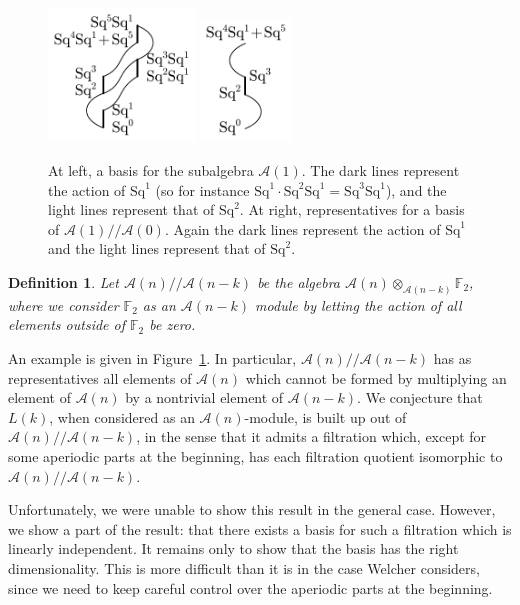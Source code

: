 \documentclass{article}
\newcommand{\A}{\mathcal{A}}
\newcommand{\F}{\mathbb{F}}
\newcommand{\Sq}{\mathrm{Sq}}
\newcommand{\mmod}{/\!/\!}
\newtheorem{defn}{Definition}
\begin{document}
\begin{figure}
  \begin{center}
    \includegraphics[height=1.4in]{pics/A1.pdf}
    \hspace{1in}
    \includegraphics[height=1.3in]{pics/A1-A0.pdf}
  \end{center}
  \caption{At left, a basis for the subalgebra $\A(1)$.  The dark lines represent the action of $\Sq^1$ (so for instance $\Sq^1 \cdot \Sq^2\Sq^1 = \Sq^3\Sq^1$), and the light lines represent that of $\Sq^2$.  At right, representatives for a basis of $\A(1)\mmod\A(0)$.  Again the dark lines represent the action of $\Sq^1$ and the light lines represent that of $\Sq^2$.\label{fig:A1}}
\end{figure}

\begin{defn}
  Let $\A(n)\mmod\A(n-k)$ be the algebra $\A(n)\otimes_{\A(n-k)}\F_2$, where we consider $\F_2$ as an $\A(n-k)$ module by letting the action of all elements outside of $\F_2$ be zero.
\end{defn}

An example is given in Figure~\ref{fig:A1}.  In particular, $\A(n)\mmod\A(n-k)$ has as representatives all elements of $\A(n)$ which cannot be formed by multiplying an element of $\A(n)$ by a nontrivial element of $\A(n-k)$.  We conjecture that $L(k)$, when considered as an $\A(n)$-module, is built up out of $\A(n)\mmod\A(n-k)$, in the sense that it admits a filtration which, except for some aperiodic parts at the beginning, has each filtration quotient isomorphic to $\A(n)\mmod\A(n-k)$.

Unfortunately, we were unable to show this result in the general case.  However, we show a part of the result: that there exists a basis for such a filtration which is linearly independent.  It remains only to show that the basis has the right dimensionality.  This is more difficult than it is in the case Welcher considers, since we need to keep careful control over the aperiodic parts at the beginning.
\end{document}

